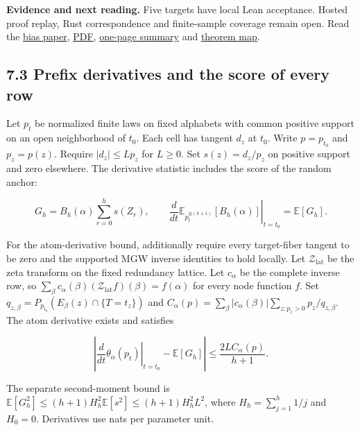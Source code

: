 \documentclass[
  11pt,
  a4paper,
]{article}
\begin{document}
\textbf{Evidence and next reading.} Five targets have local Lean
acceptance. Hosted proof replay, Rust correspondence and finite-sample
coverage remain open. Read the
\href{https://github.com/sepahead/pid-rs/blob/main/audit/formal/lean-prefix-mgw-bias/EXPOSITION.md}{bias
paper},
\href{https://github.com/sepahead/pid-rs/blob/main/output/pdf/prefix-mgw-bias.pdf}{PDF},
\href{https://github.com/sepahead/pid-rs/blob/main/output/pdf/prefix-mgw-bias-summary.pdf}{one-page
summary} and
\href{https://github.com/sepahead/pid-rs/blob/main/audit/formal/lean-prefix-mgw-bias/THEOREM_MAP.md}{theorem
map}.


\subsection{7.3 Prefix derivatives and the score of every
row}\label{73-prefix-derivatives-and-the-score-of-every-row}

Let \(p_t\) be normalized finite laws on fixed alphabets with common
positive support on an open neighborhood of \(t_0\). Each cell has
tangent \(d_z\) at \(t_0\). Write \(p=p_{t_0}\) and \(p_z=p(z)\).
Require \(|d_z|\le Lp_z\) for \(L\ge0\). Set \(s(z)=d_z/p_z\) on
positive support and zero elsewhere. The derivative statistic includes
the score of the random anchor:

\[
G_h=B_h(\alpha)\sum_{r=0}^{h}s(Z_r),\qquad
\left.\frac{d}{dt}\mathbb E_{p_t^{\otimes(h+1)}}[B_h(\alpha)]\right|_{t=t_0}
=\mathbb E[G_h].
\]

For the atom-derivative bound, additionally require every target-fiber
tangent to be zero and the supported MGW inverse identities to hold
locally. Let \(\mathcal Z_{\mathrm{lat}}\) be the zeta transform on the
fixed redundancy lattice. Let \(c_\alpha\) be the complete inverse row,
so
\(\sum_\beta c_\alpha(\beta)(\mathcal Z_{\mathrm{lat}}f)(\beta)=f(\alpha)\)
for every node function \(f\). Set
\(q_{z,\beta}=P_{p_{t_0}}(E_\beta(z)\cap\{T=t_z\})\) and
\(C_\alpha(p)=\sum_\beta|c_\alpha(\beta)|\sum_{z:p_z>0}p_z/q_{z,\beta}\).
The atom derivative exists and satisfies

\[
\left|\left.\frac{d}{dt}\theta_\alpha(p_t)\right|_{t=t_0}
-\mathbb E[G_h]\right|\le\frac{2LC_\alpha(p)}{h+1}.
\]

The separate second-moment bound is
\(\mathbb E[G_h^2]\le(h+1)H_h^2\mathbb E[s^2]\le(h+1)H_h^2L^2\), where
\(H_h=\sum_{j=1}^h1/j\) and \(H_0=0\). Derivatives use nats per
parameter unit.
\end{document}
